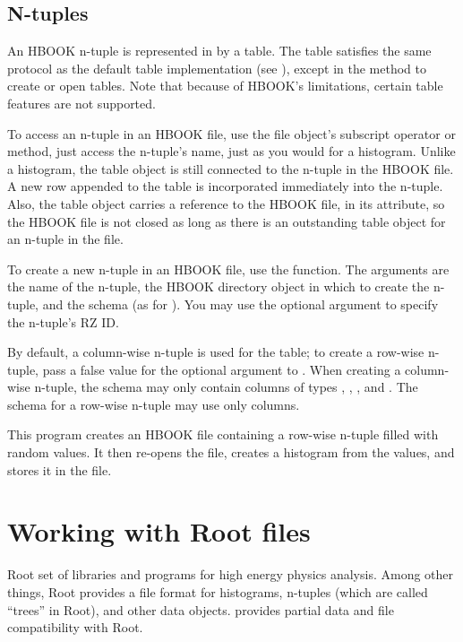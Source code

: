 \subsection{N-tuples}

An HBOOK n-tuple is represented in \pyhep by a table.  The table
satisfies the same protocol as the default table implementation (see
), except in the method to create or open tables.
Note that because of HBOOK's limitations, certain table features are not
supported.

To access an n-tuple in an HBOOK file, use the file object's subscript
operator or  method, just access the n-tuple's name, just as
you would for a histogram.  Unlike a histogram, the table object is
still connected to the n-tuple in the HBOOK file.  A new row appended to
the table is incorporated immediately into the n-tuple.  Also, the table
object carries a reference to the HBOOK file, in its 
attribute, so the HBOOK file is not closed as long as there is an
outstanding table object for an n-tuple in the file.

To create a new n-tuple in an HBOOK file, use the
 function.  The arguments are the
name of the n-tuple, the HBOOK directory object in which to create the
n-tuple, and the schema (as for ).  You may
use the optional  argument to specify the n-tuple's RZ ID.

By default, a column-wise n-tuple is used for the table; to create a
row-wise n-tuple, pass a false value for the optional 
argument to .  When creating a column-wise n-tuple,
the schema may only contain columns of types ,
, , and .  The
schema for a row-wise n-tuple may use only  columns.

This program creates an HBOOK file containing a row-wise n-tuple filled
with random values.  It then re-opens the file, creates a histogram from
the values, and stores it in the file.


\section{Working with Root files}

Root set of libraries and programs for high energy physics analysis.
Among other things, Root provides a file format for histograms, n-tuples
(which are called ``trees'' in Root), and other data objects.  \pyhep
provides partial data and file compatibility with Root.

